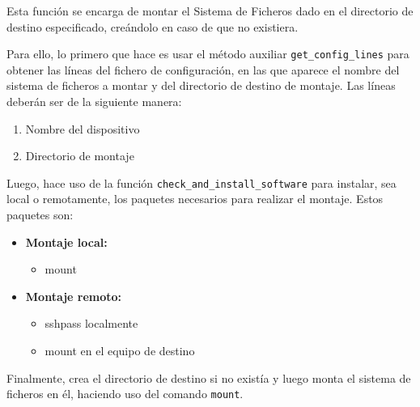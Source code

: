 Esta función se encarga de montar el Sistema de Ficheros dado en el directorio de destino especificado, creándolo en caso de que no existiera.

Para ello, lo primero que hace es usar el método auxiliar \texttt{get\_config\_lines} para obtener las líneas del fichero de configuración, en las que aparece el nombre del sistema de ficheros a montar y del directorio de destino de montaje. Las líneas deberán ser de la siguiente manera:
\begin{enumerate}
    \item Nombre del dispositivo
    \item Directorio de montaje
\end{enumerate}

Luego, hace uso de la función \texttt{check\_and\_install\_software} para instalar, sea local o remotamente, los paquetes necesarios para realizar el montaje. Estos paquetes son:
\begin{itemize}
    \item \textbf{Montaje local:}
    \begin{itemize}
        \item mount
    \end{itemize}
    \item \textbf{Montaje remoto:}
    \begin{itemize}
        \item sshpass localmente
        \item mount en el equipo de destino
    \end{itemize}
\end{itemize}

Finalmente, crea el directorio de destino si no existía y luego monta el sistema de ficheros en él, haciendo uso del comando \texttt{mount}\cite{mount}.